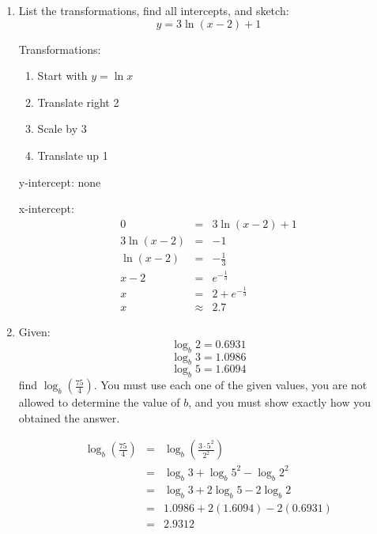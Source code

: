 \documentclass[letterpaper,12pt,fleqn]{article}
\begin{document}
\begin{enumerate}
\item List the transformations, find all intercepts, and sketch:
  \[y=3\ln(x-2)+1\]

  Transformations:
  \begin{enumerate}[label={\arabic*)}]
  \item Start with $y=\ln{x}$
  \item Translate right 2
  \item Scale by 3
  \item Translate up 1
  \end{enumerate}

  y-intercept: none

  x-intercept:
  \begin{eqnarray*}
    0 &=& 3\ln(x-2)+1 \\
    3\ln(x-2) &=& -1 \\
    \ln(x-2) &=& -\frac{1}{3} \\
    x-2 &=& e^{-\frac{1}{3}} \\
    x &=& 2+e^{-\frac{1}{3}} \\
    x &\approx& 2.7
  \end{eqnarray*}


\item Given:
  \[\log_b{2}=0.6931\]
  \[\log_b{3}=1.0986\]
  \[\log_b{5}=1.6094\]
  find $\log_b{\left(\frac{75}{4}\right)}$. You must use each one of the given
  values, you are not allowed to determine the value of $b$, and you must show
  exactly how you obtained the answer.

  \begin{eqnarray*}
    \log_b{\left(\frac{75}{4}\right)} &=&
    \log_b{\left(\frac{3\cdot5^2}{2^2}\right)} \\
    &=& \log_b{3}+\log_b{5^2}-\log_b{2^2} \\
    &=& \log_b{3}+2\log_b{5}-2\log_b{2} \\
    &=& 1.0986+2(1.6094)-2(0.6931) \\
    &=& 2.9312
  \end{eqnarray*}


\end{enumerate}
\end{document}
